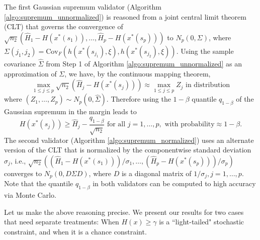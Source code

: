 \documentclass[mnsc,blindrev]{informs4} %
\begin{document}
The first Gaussian supremum validator (Algorithm \ref{algo:supremum_unnormalized}) is reasoned from a joint central limit theorem (CLT) that governs the convergence of $\sqrt{n_2}(\hat H_{1}-H(x^*(s_1)),\ldots,\hat H_{p}-H(x^*(s_p)))$ to $N_p(0,\Sigma)$, where $\Sigma(j_1,j_2)=\mathrm{Cov}_F(h(x^*(s_{j_1}),\xi),h(x^*(s_{j_2}),\xi))$. Using the sample covariance $\hat{\Sigma}$ from Step 1 of Algorithm \ref{algo:supremum_unnormalized} as an approximation of $\Sigma$, we have, by the continuous mapping theorem,
\begin{equation*}
    \max_{1\leq j\leq p}\sqrt{n_2}(\hat H_{j}-H(x^*(s_j)))\approx \max_{1\leq j\leq p}Z_j\text{\ \ in distribution}
\end{equation*}
where $(Z_1,\ldots,Z_p)\sim N_p(0,\hat\Sigma)$. Therefore using the $1-\beta$ quantile $q_{1-\beta}$ of the Gaussian supremum in the margin leads to
\begin{equation*}
    H(x^*(s_j))\geq \hat H_{j}-\frac{q_{1-\beta}}{\sqrt{n_2}}\text{ for all }j=1,\ldots,p,\text{ with probability}\approx 1-\beta.
\end{equation*}
The second validator (Algorithm \ref{algo:supremum_normalized}) uses an alternate version of the CLT that is normalized by the componentwise standard deviation $\sigma_j$, i.e., $\sqrt{n_2}((\hat H_{1}-H(x^*(s_1)))/\sigma_1,\ldots,(\hat H_{p}-H(x^*(s_p)))/\sigma_p)$ converges to $N_p(0,D\Sigma D)$, where $D$ is a diagonal matrix of $1/\sigma_j,j=1,\ldots,p$. Note that the quantile $q_{1-\beta}$ in both validators can be computed to high accuracy via Monte Carlo.

Let us make the above reasoning precise. We present our results for two cases that need separate treatments: When $H(x)\geq\gamma$  is a ``light-tailed" stochastic constraint, and when it is a chance constraint.
\end{document}
